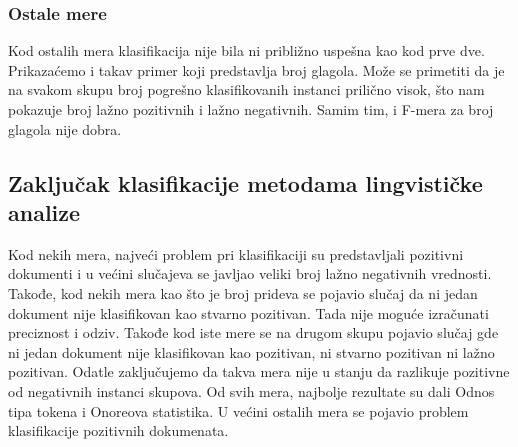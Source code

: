 \documentclass[12pt,oneside]{memoir}
\begin{document}
\subsubsection{Ostale mere}
Kod ostalih mera klasifikacija nije bila ni približno uspešna kao kod prve dve.  Prikazaćemo i takav primer koji predstavlja broj glagola.  Može se primetiti da je na svakom skupu broj pogrešno klasifikovanih instanci prilično visok, što nam pokazuje broj lažno pozitivnih i lažno negativnih. Samim tim, i F-mera za broj glagola nije dobra. 
\newline
\newline
\noindent{}
\newline
\newline

\subsection{Zaključak klasifikacije metodama lingvističke analize}

Kod nekih mera, najveći problem pri klasifikaciji su predstavljali pozitivni dokumenti i u većini slučajeva se javljao veliki broj lažno negativnih vrednosti. Takođe,  kod nekih mera kao što je broj prideva se pojavio slučaj da ni jedan dokument nije klasifikovan kao stvarno pozitivan.  Tada nije moguće izračunati preciznost i odziv.  Takođe kod iste mere se na drugom skupu pojavio slučaj gde ni jedan dokument nije klasifikovan kao pozitivan,  ni stvarno pozitivan ni lažno pozitivan. Odatle zaključujemo da takva mera nije u stanju da razlikuje pozitivne od negativnih instanci skupova.  Od svih mera, najbolje rezultate su dali Odnos tipa tokena i Onoreova statistika. U većini ostalih mera se pojavio problem klasifikacije pozitivnih dokumenata.  
\end{document}
